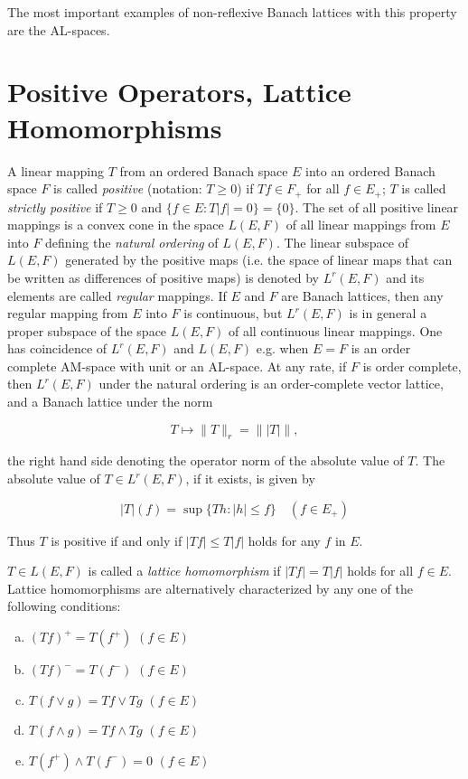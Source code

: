 The most important examples of non-reflexive Banach lattices with this property are the AL-spaces.

\section{Positive Operators, Lattice Homomorphisms}\label{sec:c1-6}

A linear mapping $ T $ from an ordered Banach space $ E $ into an ordered Banach space $ F $ is called \emph{positive} (notation: $ T \geq 0 $) if $ Tf \in F_{+} $ for all $ f \in E_{+} $; $ T $ is called \emph{strictly positive} if $ T \geq 0 $ and $ \{f \in E \colon T|f| = 0\} = \{0\} $.
The set of all positive linear mappings is a convex cone in the space $ L(E,F) $ of all linear mappings from $ E $ into $ F $ defining the \emph{natural ordering} of $ L(E,F) $.
The linear subspace of $ L(E,F) $ generated by the positive maps (i.e. the space of linear maps that can be written as differences of positive maps) is denoted by $ L^{r}(E,F) $ and its elements are called \emph{regular} mappings.
If $ E $ and $ F $ are Banach lattices, then any regular mapping from $ E $ into $ F $ is continuous, but $ L^{r}(E,F) $ is in general a proper subspace of the space $ L(E,F) $ of all continuous linear mappings.
One has coincidence of $ L^{r}(E,F) $ and $ L(E,F) $ e.g. when $ E = F $ is an order complete AM-space with unit or an AL-space.
At any rate, if $ F $ is order complete, then $ L^{r}(E,F) $ under the natural ordering is an order-complete vector lattice, and a Banach lattice under the norm

\[
T \mapsto \|T\|_{r} = \| |T| \|,
\]

the right hand side denoting the operator norm of the absolute value of $ T $.
The absolute value of $ T \in L^{r}(E,F) $, if it exists, is given by

\[
|T|(f) = \sup\{ Th : |h| \leq f \} \quad (f \in E_{+})
\]

Thus $ T $ is positive if and only if $ |Tf| \leq T|f| $ holds for any $ f $ in $ E $.




\pagebreak


$ T \in L(E,F) $ is called a \emph{lattice homomorphism} if $ |Tf| = T|f| $ holds for all $ f \in E $.
Lattice homomorphisms are alternatively characterized by any one of the following conditions:

\begin{enumerate}[(a)]
\item $(Tf)^{+} = T(f^{+})$ \quad $(f \in E)$

\item $(Tf)^{-} = T(f^{-})$ \quad $(f \in E)$

\item $T(f\vee g) = Tf\vee Tg$ \quad $(f \in E)$

\item $T(f\wedge g) = Tf\wedge Tg$ \quad $(f \in E)$

\item $T(f^{+})\wedge T(f^{-}) = 0$ \quad $(f \in E)$
\end{enumerate}

